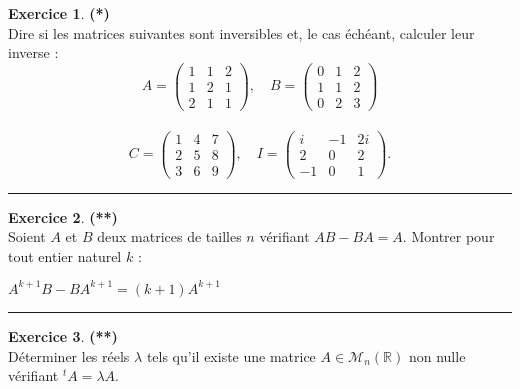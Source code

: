 \documentclass[a4paper,11pt]{article}
\theoremstyle{definition}
\newtheorem{exo}{Exercice} %
\begin{document}
\begin{minipage}{1\linewidth}
	\begin{minipage}[t]{0.48\linewidth}
		\raggedright
		
				\begin{exo}\textbf{(*)}\quad\\[0.2cm]
			Dire si les matrices suivantes sont inversibles et, le
			cas échéant, calculer leur inverse :\quad\\[-0.2cm]
			$$A=\left(
			\begin{array}{rcl}
			1&1&2\\
			1&2&1\\
			2&1&1
			\end{array}
			\right),\quad
			B=\left(
			\begin{array}{rcl}
			0&1&2\\
			1&1&2\\
			0&2&3
			\end{array}
			\right)$$\\[-0.2cm] $$ 
			C=\left(
			\begin{array}{rcl}
			1&4&7\\
			2&5&8\\
			3&6&9
			\end{array}\right),\quad
			I=\left(
			\begin{array}{rcl}
			i&-1&2i\\
			2&0&2\\
			-1&0&1
			\end{array}\right).$$
			\centering
			\rule{1\linewidth}{0.6pt}
		\end{exo}

					\begin{exo}\textbf{(**)}\quad\\[0.2cm]
		Soient $A$ et $B$ deux matrices de tailles $n$ vérifiant $AB-BA=A$. Montrer pour tout entier naturel $k$ :
		
		$A^{k+1}B  - BA^{k+1}= (k+ 1)A^{k+1}$
		\centering
		\rule{1\linewidth}{0.6pt}
	\end{exo}	

		
	\end{minipage}	
	\hfill\vrule\hfill
	\begin{minipage}[t]{0.48\linewidth}
		\raggedright
		

		\begin{exo}\textbf{(**)}\quad\\[0.2cm]
	Déterminer les réels $\lambda$ tels qu'il existe une matrice $A\in\mathcal M_n(\mathbb R)$ non nulle vérifiant ${}^t\!A = \lambda A$.
	

\end{exo}
\end{minipage}
\end{minipage}
\end{document}
